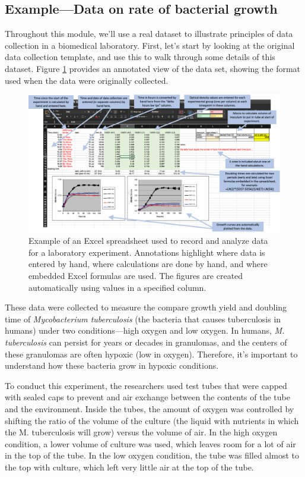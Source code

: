 \documentclass[]{tufte-book}
\begin{document}
\subsection{Example---Data on rate of bacterial growth}\label{exampledata-on-rate-of-bacterial-growth}

Throughout this module, we'll use a real dataset to illustrate principles of
data collection in a biomedical laboratory. First, let's start by looking at the
original data collection template, and use this to walk through some details of
this dataset. Figure \ref{fig:growthexcel1} provides an annotated view of the
data set, showing the format used when the data were originally collected.

\begin{figure}
\includegraphics[width=\textwidth]{figures/growth_curve_example} \caption[Example of an Excel spreadsheet used to record and analyze data for a laboratory experiment]{Example of an Excel spreadsheet used to record and analyze data for a laboratory experiment. Annotations highlight where data is entered by hand, where calculations are done by hand, and where embedded Excel formulas are used. The figures are created automatically using values in a specified column.}\label{fig:growthexcel1}
\end{figure}

These data were collected to measure the compare growth yield and doubling time
of \emph{Mycobacterium tuberculosis} (the bacteria that causes tuberculosis in
humans) under two conditions---high oxygen and low oxygen. In humans, \emph{M.
tuberculosis} can persist for years or decades in granulomas, and the centers of
these granulomas are often hypoxic (low in oxygen). Therefore, it's important to
understand how these bacteria grow in hypoxic conditions.

To conduct this experiment, the researchers used test tubes that were capped
with sealed caps to prevent and air exchange between the contents of the tube
and the environment. Inside the tubes, the amount of oxygen was controlled
by shifting the ratio of the volume of the culture (the liquid with nutrients
in which the M. tuberculosis will grow) versus the volume of air.
In the high oxygen condition, a lower volume of culture was used, which leaves
room for a lot of air in the top of the tube. In the low oxygen condition,
the tube was filled almost to the top with culture, which left very little air
at the top of the tube.
\end{document}
